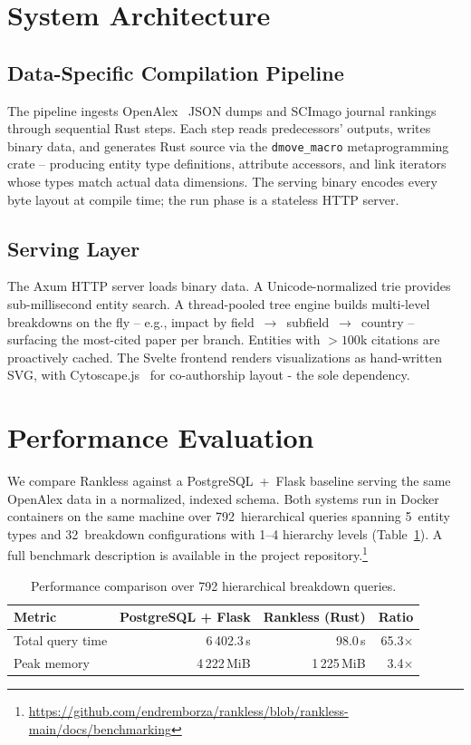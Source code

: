 \documentclass{article}
\newcommand{\evalQueries}{792}
\newcommand{\evalConfigs}{32}
\newcommand{\evalRootTypes}{5}
\newcommand{\evalTimeFlask}{6\,402.3}
\newcommand{\evalTimeRs}{98.0}
\newcommand{\evalSpeedup}{65.3}
\newcommand{\evalFlaskPeak}{4\,222}
\newcommand{\evalRsPeak}{1\,225}
\newcommand{\evalPeakRatio}{3.4}
\begin{document}
%
\section{System Architecture}
\label{sec:architecture}

\subsection{Data-Specific Compilation Pipeline}

The pipeline ingests OpenAlex~\cite{openalex} JSON dumps and SCImago journal rankings through sequential Rust steps. Each step reads predecessors' outputs, writes binary data, and generates Rust source via the \texttt{dmove\_macro} metaprogramming crate -- producing entity type definitions, attribute accessors, and link iterators whose types match actual data dimensions. The serving binary encodes every byte layout at compile time; the run phase is a stateless HTTP server.

\subsection{Serving Layer}

The Axum HTTP server loads binary data. A Unicode-normalized trie provides sub-millisecond entity search. A thread-pooled tree engine builds multi-level breakdowns on the fly -- e.g., impact by field~$\to$~subfield~$\to$~country -- surfacing the most-cited paper per branch. Entities with ${>}100$k citations are proactively cached. The Svelte frontend renders visualizations as hand-written SVG, with Cytoscape.js~\cite{cytoscape} for co-authorship layout - the sole dependency.

%
\section{Performance Evaluation}
\label{sec:evaluation}

We compare Rankless against a PostgreSQL~+~Flask baseline serving the same OpenAlex data in a normalized, indexed schema. Both systems run in Docker containers on the same machine over \evalQueries{}~hierarchical queries spanning \evalRootTypes{}~entity types and \evalConfigs{}~breakdown configurations with 1--4 hierarchy levels (Table~\ref{tab:benchmark}). A full benchmark description is available in the project repository.\footnote{\url{https://github.com/endremborza/rankless/blob/rankless-main/docs/benchmarking}}

\begin{table}[t]
\caption{Performance comparison over \evalQueries{} hierarchical breakdown queries.}\label{tab:benchmark}
\centering
\begin{tabular}{@{}lrrr@{}}
\toprule
Metric & PostgreSQL + Flask & Rankless (Rust) & Ratio \\
\midrule
Total query time & \evalTimeFlask{}\,s & \evalTimeRs{}\,s & \evalSpeedup{}$\times$ \\
Peak memory & \evalFlaskPeak{}\,MiB & \evalRsPeak{}\,MiB & \evalPeakRatio{}$\times$ \\
\bottomrule
\end{tabular}
\end{table}
\end{document}
